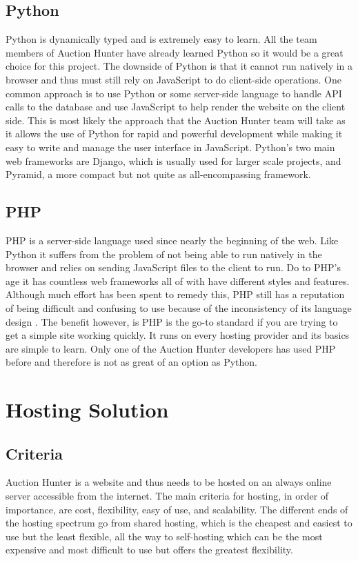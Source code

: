 \documentclass[onecolumn, draftclsnofoot,10pt, compsoc]{IEEEtran}
\begin{document}
\subsection{Python}
Python is dynamically typed and is extremely easy to learn. All the team members of Auction Hunter have already learned Python so it would be a great choice for this project. The downside of Python is that it cannot run natively in a browser and thus must still rely on JavaScript to do client-side operations. One common approach is to use Python or some server-side language to handle API calls to the database and use JavaScript to help render the website on the client side. This is most likely the approach that the Auction Hunter team will take as it allows the use of Python for rapid and powerful development while making it easy to write and manage the user interface in JavaScript. Python's two main web frameworks are Django, which is usually used for larger scale projects, and Pyramid, a more compact but not quite as all-encompassing framework. 

\subsection{PHP}
PHP is a server-side language used since nearly the beginning of the web. Like Python it suffers from the problem of not being able to run natively in the browser and relies on sending JavaScript files to the client to run. Do to PHP’s age it has countless web frameworks all of with have different styles and features. Although much effort has been spent to remedy this, PHP still has a reputation of being difficult and confusing to use because of the inconsistency of its language design \cite{php}. The benefit however, is PHP is the go-to standard if you are trying to get a simple site working quickly. It runs on every hosting provider and its basics are simple to learn. Only one of the Auction Hunter developers has used PHP before and therefore is not as great of an option as Python.

\section{Hosting Solution}
\subsection{Criteria}
Auction Hunter is a website and thus needs to be hosted on an always online server accessible from the internet. The main criteria for hosting, in order of importance, are cost, flexibility, easy of use, and scalability. The different ends of the hosting spectrum go from shared hosting, which is the cheapest and easiest to use but the least flexible, all the way to self-hosting which can be the most expensive and most difficult to use but offers the greatest flexibility.
\end{document}
